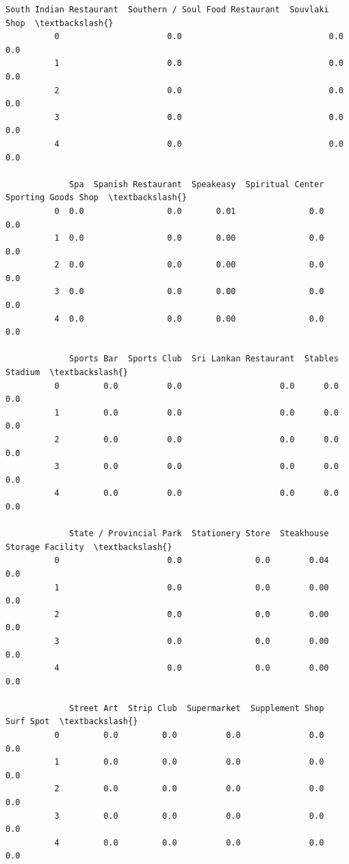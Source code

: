 \documentclass[11pt]{article}
\begin{document}
\begin{Verbatim}[commandchars=\\\{\}]
             South Indian Restaurant  Southern / Soul Food Restaurant  Souvlaki Shop  \textbackslash{}
          0                      0.0                              0.0            0.0   
          1                      0.0                              0.0            0.0   
          2                      0.0                              0.0            0.0   
          3                      0.0                              0.0            0.0   
          4                      0.0                              0.0            0.0   
          
             Spa  Spanish Restaurant  Speakeasy  Spiritual Center  Sporting Goods Shop  \textbackslash{}
          0  0.0                 0.0       0.01               0.0                  0.0   
          1  0.0                 0.0       0.00               0.0                  0.0   
          2  0.0                 0.0       0.00               0.0                  0.0   
          3  0.0                 0.0       0.00               0.0                  0.0   
          4  0.0                 0.0       0.00               0.0                  0.0   
          
             Sports Bar  Sports Club  Sri Lankan Restaurant  Stables  Stadium  \textbackslash{}
          0         0.0          0.0                    0.0      0.0      0.0   
          1         0.0          0.0                    0.0      0.0      0.0   
          2         0.0          0.0                    0.0      0.0      0.0   
          3         0.0          0.0                    0.0      0.0      0.0   
          4         0.0          0.0                    0.0      0.0      0.0   
          
             State / Provincial Park  Stationery Store  Steakhouse  Storage Facility  \textbackslash{}
          0                      0.0               0.0        0.04               0.0   
          1                      0.0               0.0        0.00               0.0   
          2                      0.0               0.0        0.00               0.0   
          3                      0.0               0.0        0.00               0.0   
          4                      0.0               0.0        0.00               0.0   
          
             Street Art  Strip Club  Supermarket  Supplement Shop  Surf Spot  \textbackslash{}
          0         0.0         0.0          0.0              0.0        0.0   
          1         0.0         0.0          0.0              0.0        0.0   
          2         0.0         0.0          0.0              0.0        0.0   
          3         0.0         0.0          0.0              0.0        0.0   
          4         0.0         0.0          0.0              0.0        0.0   
          

\end{Verbatim}
\end{document}
